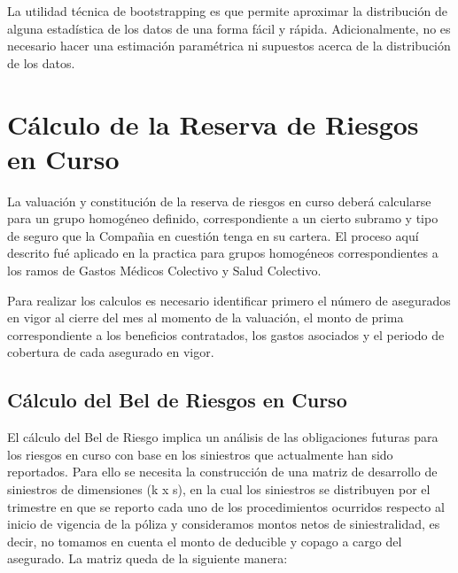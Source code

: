 \documentclass[11pt,twoside,openright,spanish]{report}
\numberwithin{equation}{chapter}
\numberwithin{figure}{chapter}
\numberwithin{table}{chapter}
\begin{document}
\doublespacing

La utilidad técnica de bootstrapping es que permite aproximar la distribución de alguna estadística de los datos de una forma fácil y rápida. Adicionalmente, no es necesario hacer una estimación paramétrica ni supuestos acerca de la distribución de los datos.

	\doublespacing


	
	\chapter{Cálculo de la Reserva de Riesgos en Curso}\label{metnum}
	
		La valuación y constitución de la reserva de riesgos en curso deberá calcularse para un grupo homogéneo definido, correspondiente a un cierto subramo y tipo de seguro que la Compañia en cuestión tenga en su cartera. El proceso aquí descrito fué aplicado en la practica para grupos homogéneos correspondientes a los ramos de Gastos Médicos Colectivo y Salud Colectivo.
	
	\doublespacing
Para realizar los calculos es necesario identificar primero el número de asegurados en vigor al cierre del mes al momento de la valuación, el monto de prima correspondiente a los beneficios contratados, los gastos asociados y el periodo de cobertura de cada asegurado en vigor.
	
	\section{Cálculo del Bel de Riesgos en Curso}
	\doublespacing
	
	\doublespacing
	El cálculo del Bel de Riesgo implica un análisis de las obligaciones futuras para los riesgos en curso con base en los siniestros que actualmente han sido reportados. Para ello se necesita la construcción de una matriz de desarrollo de siniestros  de dimensiones (k x s), en la cual los siniestros se distribuyen por el trimestre en que se reporto cada uno de los procedimientos ocurridos respecto al inicio de vigencia de la póliza y consideramos montos netos de siniestralidad, es decir, no tomamos en cuenta el monto de deducible y copago a cargo del asegurado. La matriz queda de la siguiente manera:
	

	
	\doublespacing

$ $

\doublespacing
	
\end{document}
